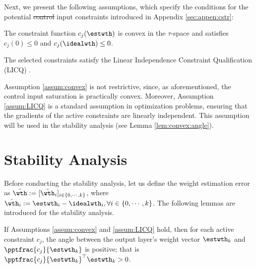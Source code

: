 \documentclass[letterpaper, journal]{IEEEtran}
\providecommand{\DIFadd}[1]{{\protect\color{blue}\uwave{#1}}} %
\providecommand{\DIFdel}[1]{{\protect\color{red}\sout{#1}}} %
\providecommand{\DIFaddbegin}{} %
\providecommand{\DIFaddend}{} %
\providecommand{\DIFdelbegin}{} %
\providecommand{\DIFdelend}{} %
\begin{document}
Next, we present the following assumptions, which specify the conditions for the potential \DIFdelbegin \DIFdel{control }\DIFdelend input constraints introduced in Appendix \ref{sec:appen:cstr}:

\begin{assum}
    The constraint function $c_j(\estwth)$ is convex in the \DIFaddbegin \DIFadd{(input-) }\DIFaddend $\tau$-space and satisfies $c_j(0) \le 0$ and $c_j(\idealwth)\le 0$.
    \label{assum:convex}
\end{assum}

\begin{assum}
    The selected constraints satisfy the Linear Independence Constraint Qualification (LICQ) \cite[Chap.~12, Def.~12.1]{Nocedal:2006aa}.
    \label{assum:LICQ}
\end{assum}

\begin{remark}
    Assumption \ref{assum:convex} is not restrictive, since, as aforementioned, the control input saturation is practically convex.
    Moreover, Assumption \ref{assum:LICQ} is a standard assumption in optimization problems, ensuring that the gradients of the active constraints are linearly independent.
    This assumption will be used in the stability analysis (see Lemma \ref{lem:convex:angle}).
\end{remark}

\section{Stability Analysis}\label{sec:stability}

Before conducting the stability analysis, let us define the weight estimation error as $\tilde\wth:= [\tilde\wth_i]_{i\in\{0,\cdots,k\}}$, where $\tilde\wth_i:=\estwth_i-\idealwth_i, \forall i\in\{0,\cdots,k\}$.
The following lemmas are introduced for the stability analysis. 

\begin{lem}
    If Assumptions \ref{assum:convex} and \ref{assum:LICQ} hold, then for each active constraint $c_j$, the angle between the output layer's weight vector $\estwth_k$ and $\pptfrac{c_j}{\estwth_k}$ is positive; that is $\pptfrac{c_j}{\estwth_k}^\top\estwth_k>0$.
    \label{lem:convex:angle}
\end{lem}
\end{document}
